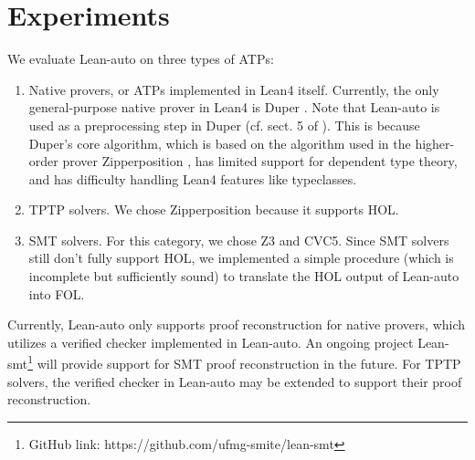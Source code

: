 \section{Experiments}\label{sectexpr}

  We evaluate Lean-auto on three types of ATPs:
  \begin{enumerate}
    \item Native provers, or ATPs implemented in Lean4 itself. Currently, the only general-purpose
      native prover in Lean4 is Duper \cite{DuperPaper}. Note that Lean-auto is
      used as a preprocessing step in Duper (cf. sect. 5 of \cite{DuperPaper}).
      This is because Duper's core algorithm, which is based on the algorithm used
      in the higher-order prover Zipperposition \cite{ZipperpositionMakeWork}, has limited support for dependent
      type theory, and has difficulty handling Lean4 features like typeclasses.
    \item TPTP solvers. We chose Zipperposition because it supports HOL.
    \item SMT solvers. For this category, we chose Z3 and CVC5. Since SMT solvers
      still don't fully support HOL, we implemented a simple procedure
      (which is incomplete but sufficiently sound) to translate the HOL output of Lean-auto into FOL.
  \end{enumerate}

  Currently, Lean-auto only supports proof reconstruction for native provers,
  which utilizes a verified checker implemented in Lean-auto. An
  ongoing project Lean-smt\footnote{GitHub link: https://github.com/ufmg-smite/lean-smt}
  will provide support for SMT proof reconstruction in the future. For TPTP solvers,
  the verified checker in Lean-auto may be extended to support their proof reconstruction.

